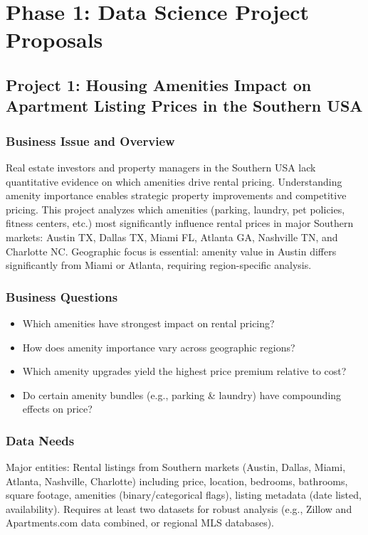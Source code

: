 \section*{Phase 1: Data Science Project Proposals}

\subsection*{Project 1: Housing Amenities Impact on Apartment Listing Prices in the Southern USA}

\subsubsection*{Business Issue and Overview}

Real estate investors and property managers in the Southern USA lack quantitative evidence on which amenities drive rental pricing. Understanding amenity importance enables strategic property improvements and competitive pricing. This project analyzes which amenities (parking, laundry, pet policies, fitness centers, etc.) most significantly influence rental prices in major Southern markets: Austin TX, Dallas TX, Miami FL, Atlanta GA, Nashville TN, and Charlotte NC. Geographic focus is essential: amenity value in Austin differs significantly from Miami or Atlanta, requiring region-specific analysis.

\subsubsection*{Business Questions}

\begin{itemize} [itemsep = -9pt]
    \item Which amenities have strongest impact on rental pricing?
    \item How does amenity importance vary across geographic regions?
    \item Which amenity upgrades yield the highest price premium relative to cost?
    \item Do certain amenity bundles (e.g., parking \& laundry) have compounding effects on price?
\end{itemize}

\subsubsection*{Data Needs}

Major entities: Rental listings from Southern markets (Austin, Dallas, Miami, Atlanta, Nashville, Charlotte) including price, location, bedrooms, bathrooms, square footage, amenities (binary/categorical flags), listing metadata (date listed, availability). Requires at least two datasets for robust analysis (e.g., Zillow and Apartments.com data combined, or regional MLS databases).

